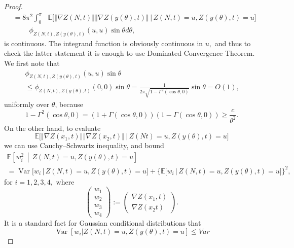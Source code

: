 \documentclass[10pt]{amsart}
\theoremstyle{definition}\newtheorem{defi}[theo]{Definition}\newtheorem{rema}[theo]{Remark}\newtheorem{exam}[theo]{Example}\newtheorem{exem}[theo]{Example}\newtheorem{nota}[theo]{Notation}
\newcommand{\bbE}{\mathbb{E}}
\DeclareMathOperator{\Var}{Var}
\begin{document}
\begin{proof}
\begin{align*}
&=8\pi ^{2}\int_{0}^{\pi }\text{ }\bbE\Big[ \left\Vert \nabla Z(N,t)\right\Vert \left\Vert \nabla Z(y(\theta),t)\right\Vert \,\Big|\, Z(N,t)=u,Z(y(\theta),t)=u\Big]\\
&\qquad\;\phi _{Z(N,t),Z(y(\theta),t)}(u,u)\sin
\theta d\theta \text{,}
\end{align*}
is continuous. The integrand function is obviously continuous in $u,$ and thus to check the latter statement it is enough to use Dominated Convergence Theorem. We first note that
\begin{multline*}
\phi _{Z(N,t),Z(y(\theta),t)}(u,u)\sin \theta\\
\leq \phi _{Z(N,t),Z(y(\theta),t)}(0,0)\sin \theta 
=\frac{1}{2\pi \sqrt{1-\Gamma^{2}(\cos \theta,0)}}\sin \theta =O(1)\text{,}
\end{multline*}
uniformly over $\theta $, because
\begin{equation*}
1-\Gamma ^{2}(\cos \theta,0)=(1+\Gamma (\cos \theta,0))(1-\Gamma (\cos
\theta,0))\geq \frac{c}{\theta ^{2}}\text{.}
\end{equation*}
On the other hand, to evaluate
\begin{equation*}
\bbE\Big[\left\Vert \nabla Z(x_{1},t)\right\Vert \left\Vert
\nabla Z(x_{2},t)\right\Vert \,|\, Z(Nt)=u,Z(y(\theta),t)=u\Big]
\end{equation*}
we can use Cauchy--Schwartz inequality, and bound
\begin{multline*}
\bbE\left[ w_{i}^{2}\,\middle|\, Z(N,t)=u,Z(y(\theta),t)=u
\right] \\
=\Var\big[w_{i}\,\big|\, Z(N,t)=u,Z(y(\theta),t)=u\big] +\big\{ \bbE\big[w_{i}\,\big|\, Z(N,t)=u,Z(y(\theta),t)=u
\big] \big\} ^{2},
\end{multline*}
for $i=1,2,3,4,$ where
\begin{equation*}
\left(
\begin{array}{c}
w_{1} \\
w_{2} \\
w_{3} \\
w_{4}
\end{array}
\right) :=\left(
\begin{array}{c}
\nabla Z(x_{1},t) \\
\nabla Z(x_{2}t)
\end{array}
\right) \text{.}
\end{equation*}
It is a standard fact for Gaussian conditional distributions that
\begin{equation*}
\Var\left[\left. w_{i}\right\vert Z(N,t)=u,Z(y(\theta),t)=u\right] \leq Var

\end{equation*}
\end{proof}
\end{document}
